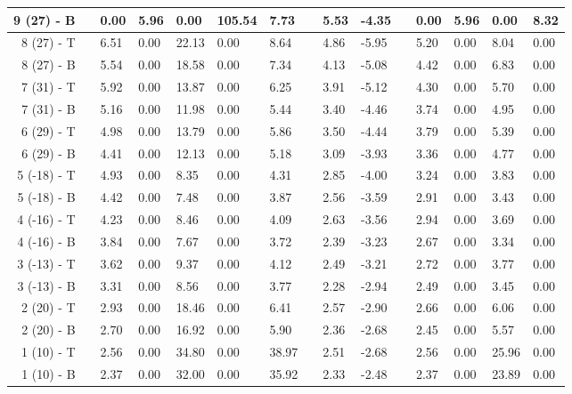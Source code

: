 \begin{table}[H]
\begin{longtable}{@{}rllllllllllllll@{}}
   9 (27) - B &&    0.00 &    5.96 &    0.00 &  105.54 &  7.73 && 5.53 & -4.35 &&     0.00 &     5.96 &     0.00 &     8.32 \\\midrule
   8 (27) - T &&    6.51 &    0.00 &   22.13 &    0.00 &  8.64 && 4.86 & -5.95 &&     5.20 &     0.00 &     8.04 &     0.00 \\
   8 (27) - B &&    5.54 &    0.00 &   18.58 &    0.00 &  7.34 && 4.13 & -5.08 &&     4.42 &     0.00 &     6.83 &     0.00 \\\midrule
   7 (31) - T &&    5.92 &    0.00 &   13.87 &    0.00 &  6.25 && 3.91 & -5.12 &&     4.30 &     0.00 &     5.70 &     0.00 \\
   7 (31) - B &&    5.16 &    0.00 &   11.98 &    0.00 &  5.44 && 3.40 & -4.46 &&     3.74 &     0.00 &     4.95 &     0.00 \\\midrule
   6 (29) - T &&    4.98 &    0.00 &   13.79 &    0.00 &  5.86 && 3.50 & -4.44 &&     3.79 &     0.00 &     5.39 &     0.00 \\
   6 (29) - B &&    4.41 &    0.00 &   12.13 &    0.00 &  5.18 && 3.09 & -3.93 &&     3.36 &     0.00 &     4.77 &     0.00 \\\midrule
  5 (-18) - T &&    4.93 &    0.00 &    8.35 &    0.00 &  4.31 && 2.85 & -4.00 &&     3.24 &     0.00 &     3.83 &     0.00 \\
  5 (-18) - B &&    4.42 &    0.00 &    7.48 &    0.00 &  3.87 && 2.56 & -3.59 &&     2.91 &     0.00 &     3.43 &     0.00 \\\midrule
  4 (-16) - T &&    4.23 &    0.00 &    8.46 &    0.00 &  4.09 && 2.63 & -3.56 &&     2.94 &     0.00 &     3.69 &     0.00 \\
  4 (-16) - B &&    3.84 &    0.00 &    7.67 &    0.00 &  3.72 && 2.39 & -3.23 &&     2.67 &     0.00 &     3.34 &     0.00 \\\midrule
  3 (-13) - T &&    3.62 &    0.00 &    9.37 &    0.00 &  4.12 && 2.49 & -3.21 &&     2.72 &     0.00 &     3.77 &     0.00 \\
  3 (-13) - B &&    3.31 &    0.00 &    8.56 &    0.00 &  3.77 && 2.28 & -2.94 &&     2.49 &     0.00 &     3.45 &     0.00 \\\midrule
   2 (20) - T &&    2.93 &    0.00 &   18.46 &    0.00 &  6.41 && 2.57 & -2.90 &&     2.66 &     0.00 &     6.06 &     0.00 \\
   2 (20) - B &&    2.70 &    0.00 &   16.92 &    0.00 &  5.90 && 2.36 & -2.68 &&     2.45 &     0.00 &     5.57 &     0.00 \\\midrule
   1 (10) - T &&    2.56 &    0.00 &   34.80 &    0.00 & 38.97 && 2.51 & -2.68 &&     2.56 &     0.00 &    25.96 &     0.00 \\
   1 (10) - B &&    2.37 &    0.00 &   32.00 &    0.00 & 35.92 && 2.33 & -2.48 &&     2.37 &     0.00 &    23.89 &     0.00 \\\midrule
\end{longtable}
\end{table}